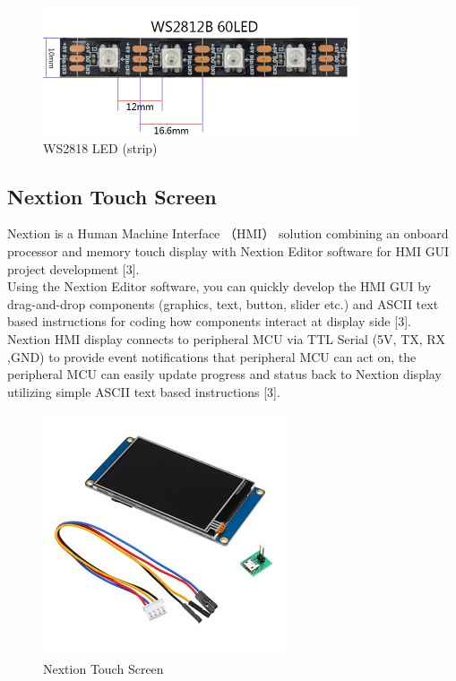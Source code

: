 \documentclass[conference]{IEEEtran}
\begin{document}
\begin{figure}[htbp]
\centerline{\includegraphics{ws2818b_strip.png}}
\caption{WS2818 LED (strip)}
\label{fig}
\end{figure}

\subsection{Nextion Touch Screen}
Nextion is a Human Machine Interface （HMI） solution combining an onboard processor and memory touch display with Nextion Editor software for HMI GUI project development [3]. \\

Using the Nextion Editor software, you can quickly develop the HMI GUI by drag-and-drop components (graphics, text, button, slider etc.) and ASCII text based instructions for coding how components interact at display side [3]. \\

Nextion HMI display connects to peripheral MCU via TTL Serial (5V, TX, RX ,GND) to provide event notifications that peripheral MCU can act on, the peripheral MCU can easily update progress and status back to Nextion display utilizing simple ASCII text based instructions [3]. \\

\begin{figure}[htbp]
\centerline{\includegraphics{nextion.jpg}}
\caption{Nextion Touch Screen}
\label{fig}
\end{figure}
\end{document}
